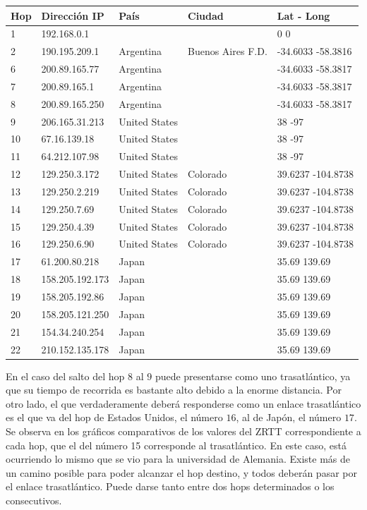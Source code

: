 \begin{center}
 \begin{tabular}{|l|l|l|l|l|}
    \hline
    Hop &Dirección IP &País &Ciudad &Lat - Long \\ \hline \hline
    1 & 192.168.0.1 &  &  & 0 0 \\ \hline
    2 & 190.195.209.1 & Argentina & Buenos Aires F.D. & -34.6033 -58.3816 \\ \hline
    6 & 200.89.165.77 & Argentina &  & -34.6033 -58.3817 \\ \hline
    7 & 200.89.165.1 & Argentina &  & -34.6033 -58.3817 \\ \hline
    8 & 200.89.165.250 & Argentina &  & -34.6033 -58.3817 \\ \hline
    9 & 206.165.31.213 & United States &  & 38 -97 \\ \hline
    10 & 67.16.139.18 & United States &  & 38 -97 \\ \hline
    11 & 64.212.107.98 & United States &  & 38 -97 \\ \hline
    12 & 129.250.3.172 & United States & Colorado & 39.6237 -104.8738 \\ \hline
    13 & 129.250.2.219 & United States & Colorado & 39.6237 -104.8738 \\ \hline
    14 & 129.250.7.69 & United States & Colorado & 39.6237 -104.8738 \\ \hline
    15 & 129.250.4.39 & United States & Colorado & 39.6237 -104.8738 \\ \hline
    16 & 129.250.6.90 & United States & Colorado & 39.6237 -104.8738 \\ \hline
    17 & 61.200.80.218 & Japan &  & 35.69 139.69 \\ \hline
    18 & 158.205.192.173 & Japan &  & 35.69 139.69 \\ \hline
    19 & 158.205.192.86 & Japan &  & 35.69 139.69 \\ \hline
    20 & 158.205.121.250 & Japan &  & 35.69 139.69 \\ \hline
    21 & 154.34.240.254 & Japan &  & 35.69 139.69 \\ \hline
    22 & 210.152.135.178 & Japan &  & 35.69 139.69 \\ \hline
 \end{tabular}
\end{center}

En el caso del salto del hop $8$ al $9$ puede presentarse como uno trasatlántico, ya que su tiempo de recorrida es bastante 
alto debido a la enorme distancia. Por otro lado, el que verdaderamente deberá responderse como un enlace trasatlántico es el que va del hop de Estados Unidos, el número $16$, al de Japón, el número $17$. Se observa en los gráficos comparativos de los valores del ZRTT correspondiente a cada hop, que el del número 15 corresponde al trasatlántico. En este caso, está ocurriendo lo mismo que se vio para la universidad de Alemania. Existe más de un camino posible para poder alcanzar el hop destino, y todos deberán pasar por el enlace trasatlántico. Puede darse tanto entre dos hops determinados o los consecutivos. 

